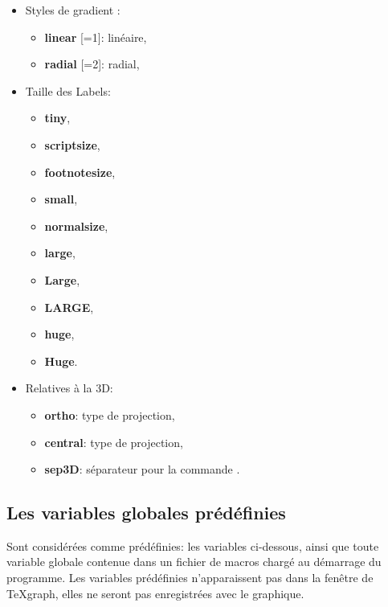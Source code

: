 \begin{itemize}
\begin{itemize}
    \item Styles de gradient :
        \begin{itemize}
        \item \textbf{linear} [=1]: linéaire,
        \item \textbf{radial} [=2]: radial,
        \end{itemize}
        
    \item Taille des Labels:
        \begin{itemize}
            \item \textbf{tiny},
        \item \textbf{scriptsize},
        \item \textbf{footnotesize},
        \item \textbf{small},
        \item \textbf{normalsize},
            \item \textbf{large},
            \item \textbf{Large},
            \item \textbf{LARGE},
            \item \textbf{huge},
            \item \textbf{Huge}.
            \end{itemize}
    \item Relatives à la 3D:
        \begin{itemize}
        \item \textbf{ortho}: type de projection,
        \item \textbf{central}: type de projection,
        \item \textbf{sep3D}: séparateur pour la commande .
            \end{itemize}

    \end{itemize}
\end{itemize}

\subsection{Les variables globales prédéfinies}

Sont considérées comme prédéfinies: les variables ci-dessous, ainsi que toute variable globale contenue dans un fichier de macros chargé au démarrage du programme. Les variables prédéfinies n'apparaissent pas dans la fenêtre de TeXgraph, elles ne seront pas enregistrées avec le graphique.


